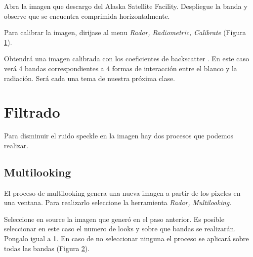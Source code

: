 Abra la imagen  que descargo del Alaska Satellite Facility. Despliegue la banda  y observe que se encuentra comprimida horizontalmente.

Para calibrar la imagen, dirijase al menu \emph{Radar, Radiometric, Calibrate} (Figura \ref{fig:calibrar}).

 \begin{figure}[h!]
     \centering
     \hfill
     \caption{}
     \label{fig:calibrar}
 \end{figure}

 Obtendrá una imagen calibrada con los coeficientes de backscatter . En este caso verá 4 bandas correspondientes a 4 formas de interacción entre el blanco y la radiación. Será cada una tema de nuestra próxima clase.

 \section{Filtrado}

 Para disminuir el ruido speckle en la imagen hay dos procesos que podemos realizar.

 \subsection{Multilooking}

 El proceso de multilooking genera una nueva imagen a partir de los pixeles en una ventana. Para realizarlo seleccione la herramienta \emph{Radar, Multilooking}.

 Seleccione en source la imagen  que generó en el paso anterior. Es posible seleccionar en este caso el numero de looks y sobre que bandas se realizarán. Pongalo igual a 1. En caso de no seleccionar ninguna el proceso se aplicará sobre todas las bandas (Figura \ref{fig:multilook}).

\begin{figure}[h!]
    \centering
    \hfill
    \caption{}
    \label{fig:multilook}
\end{figure}


